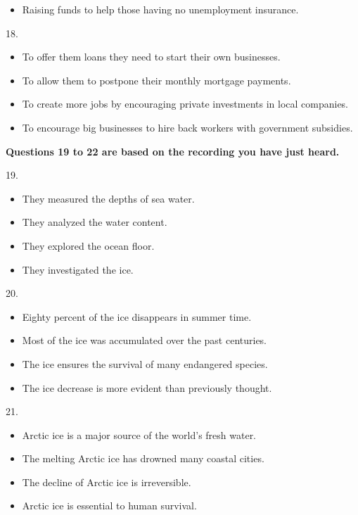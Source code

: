 \documentclass[UTF8,11pt]{ctexart}
\begin{document}
\begin{itemize}[leftmargin=2em,itemsep=.2em,topsep=.4em]\item[D.] Raising funds to help those having no unemployment insurance.
\end{itemize}

18.


\begin{itemize}[leftmargin=2em,itemsep=.2em,topsep=.4em]\item[A.] To offer them loans they need to start their own businesses.
\item[B.] To allow them to postpone their monthly mortgage payments.
\item[C.] To create more jobs by encouraging private investments in local companies.
\item[D.] To encourage big businesses to hire back workers with government subsidies.
\end{itemize}

\textbf{Questions 19 to 22 are based on the recording you have just heard.}


19.


\begin{itemize}[leftmargin=2em,itemsep=.2em,topsep=.4em]\item[A.] They measured the depths of sea water.
\item[B.] They analyzed the water content.
\item[C.] They explored the ocean floor.
\item[D.] They investigated the ice.
\end{itemize}

20.


\begin{itemize}[leftmargin=2em,itemsep=.2em,topsep=.4em]\item[A.] Eighty percent of the ice disappears in summer time.
\item[B.] Most of the ice was accumulated over the past centuries.
\item[C.] The ice ensures the survival of many endangered species.
\item[D.] The ice decrease is more evident than previously thought.
\end{itemize}

21.


\begin{itemize}[leftmargin=2em,itemsep=.2em,topsep=.4em]\item[A.] Arctic ice is a major source of the world's fresh water.
\item[B.] The melting Arctic ice has drowned many coastal cities.
\item[C.] The decline of Arctic ice is irreversible.
\item[D.] Arctic ice is essential to human survival.
\end{itemize}
\end{document}
